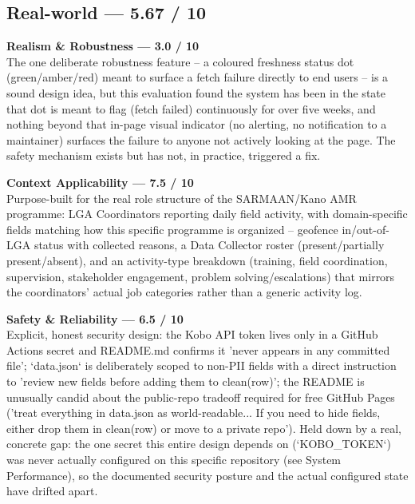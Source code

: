 \documentclass[12pt, a4paper]{article}
\begin{document}
\subsection{Real-world --- 5.67 / 10}
\begin{mdframed}[style=alertbox]\textbf{Realism \& Robustness --- 3.0 / 10}\\
The one deliberate robustness feature -- a coloured freshness status dot (green/amber/red) meant to surface a fetch failure directly to end users -- is a sound design idea, but this evaluation found the system has been in the state that dot is meant to flag (fetch failed) continuously for over five weeks, and nothing beyond that in-page visual indicator (no alerting, no notification to a maintainer) surfaces the failure to anyone not actively looking at the page. The safety mechanism exists but has not, in practice, triggered a fix.\end{mdframed}
\begin{mdframed}[style=greenbox]\textbf{Context Applicability --- 7.5 / 10}\\
Purpose-built for the real role structure of the SARMAAN/Kano AMR programme: LGA Coordinators reporting daily field activity, with domain-specific fields matching how this specific programme is organized -- geofence in/out-of-LGA status with collected reasons, a Data Collector roster (present/partially present/absent), and an activity-type breakdown (training, field coordination, supervision, stakeholder engagement, problem solving/escalations) that mirrors the coordinators' actual job categories rather than a generic activity log.\end{mdframed}
\begin{mdframed}[style=warnbox]\textbf{Safety \& Reliability --- 6.5 / 10}\\
Explicit, honest security design: the Kobo API token lives only in a GitHub Actions secret and README.md confirms it 'never appears in any committed file'; `data.json` is deliberately scoped to non-PII fields with a direct instruction to 'review new fields before adding them to clean(row)'; the README is unusually candid about the public-repo tradeoff required for free GitHub Pages ('treat everything in data.json as world-readable... If you need to hide fields, either drop them in clean(row) or move to a private repo'). Held down by a real, concrete gap: the one secret this entire design depends on (`KOBO\_TOKEN`) was never actually configured on this specific repository (see System Performance), so the documented security posture and the actual configured state have drifted apart.\end{mdframed}
\end{document}
